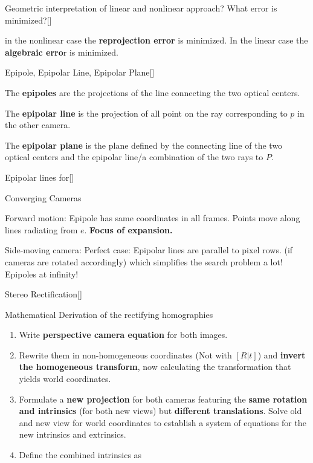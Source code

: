 \documentclass[10pt,a4paper]{scrartcl}
\begin{document}
\begin{multicols*}{2}
\begin{QandA}
{Geometric interpretation of linear and nonlinear approach? What error is minimized?}[\Application]
\item in the nonlinear case the \textbf{reprojection error} is minimized. In the linear case the \textbf{algebraic erro}r is minimized.
\end{QandA}

\begin{QandA}
{Epipole, Epipolar Line, Epipolar Plane}[\Definition]
\item The \textbf{epipoles} are the projections of the line connecting the two optical centers.
\item The \textbf{epipolar line} is the projection of all point on the ray corresponding to $p$ in the other camera.
\item The \textbf{epipolar plane} is the plane defined by the connecting line of the two optical centers and the epipolar line/a combination of the two rays to $P$.
\end{QandA}

\begin{QandA}
{Epipolar lines for}[\Comparison]
\item Converging Cameras
\item Forward motion: Epipole has same coordinates in all frames. Points move along lines radiating from $e$. \textbf{Focus of expansion.}
\item Side-moving camera: Perfect case: Epipolar lines are parallel to pixel rows. (if cameras are rotated accordingly) which simplifies the search problem a lot! Epipoles at infinity!
\end{QandA}

\begin{QandA}
{Stereo Rectification}[\Derivation]
\item Mathematical Derivation of the rectifying homographies
\begin{enumerate}
\item Write \textbf{perspective camera equation} for both images.
\item Rewrite them in non-homogeneous coordinates (Not with $[R|t]$) and \textbf{invert the homogeneous transform}, now calculating the transformation that yields world coordinates.
\item Formulate a \textbf{new projection} for both cameras featuring the \textbf{same rotation and intrinsics} (for both new views) but \textbf{different translations}. Solve old and new view for world coordinates to establish a system of equations for the new intrinsics and extrinsics.
\item Define the combined intrinsics as


\end{enumerate}
\end{QandA}
\end{multicols*}
\end{document}
